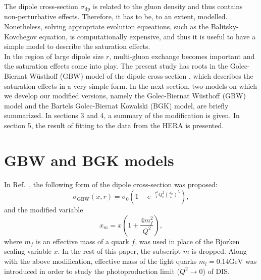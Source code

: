 \documentclass[11pt]{article}
\begin{document}
The dipole cross-section $\sigma_{\mathrm{dp}}$ is related to the gluon density and thus contains non-perturbative effects. {\color{blue} Therefore, it has to be, to an extent, modelled. Nonetheless, solving appropriate evolution equeations, such as the Balitsky-Kovchegov equation, is computationally expensive, and thus it is useful to have a simple model to describe the saturation effects.}\\
In the region of large dipole size $r$, multi-gluon exchange becomes important and the saturation effects come into play. The present study has roots in the Golec-Biernat W\"usthoff (GBW) model of the dipole cross-section \cite{gbw1998}, which describes the saturation effects in a very simple form.
In the next section, two models on which we develop our modified versions, namely the Golec-Biernat W\"usthoff (GBW) model\cite{gbw1998} and the Bartels Golec-Biernat Kowalski (BGK) model\cite{bgk2002}, are briefly summarized.  In sections 3 and 4, a summary of the modification is given. In section 5, the result of fitting to the data from the HERA\cite{hera} is presented. %
 
\section{GBW and BGK models }
In Ref.~\cite{gbw1998}, the following form of the dipole cross-section was proposed:
\begin{equation}
\sigma_{\mathrm{GBW}}(x ,r )=\sigma_{0} \left(1-e^{-\frac{r^2}{4} Q_0^2\left(\frac{x_0}{x}\right)^{\lambda} }\right),
\label{eq:gbw}
\end{equation}
and the modified variable 
\begin{equation}
x_m=x \left(1+\frac{4 m_f^2}{Q^2}\right),
\label{eq:modx}
\end{equation}
where $m_f$ is an effective mass of a quark $f$,
was used in place of the Bjorken scaling variable $x$. In the rest of this paper, the subscript $m$ is dropped. Along with the above modification, effective mass of the light quarks $m_l=0.14\mathrm{GeV}$ was introduced in order to study the photoproduction limit ($Q^2\rightarrow0$) of DIS. 
\end{document}
